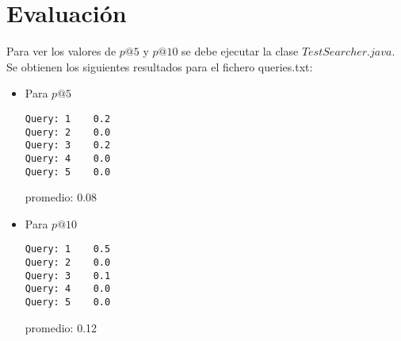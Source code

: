 \documentclass[palatino,nochap]{apuntes}
\begin{document}
\section{Evaluación}

Para ver los valores de $p@5$ y $p@10$ se debe ejecutar la clase $TestSearcher.java$. Se obtienen los siguientes resultados para el fichero queries.txt:

\begin{itemize}
	\item Para $p@5$
\begin{verbatim}
Query: 1	0.2
Query: 2	0.0
Query: 3	0.2
Query: 4	0.0
Query: 5	0.0
\end{verbatim}

promedio: 0.08
	\item Para $p@10$
\begin{verbatim}
Query: 1	0.5
Query: 2	0.0
Query: 3	0.1
Query: 4	0.0
Query: 5	0.0
\end{verbatim}

promedio: 0.12
\end{itemize}
\end{document}
